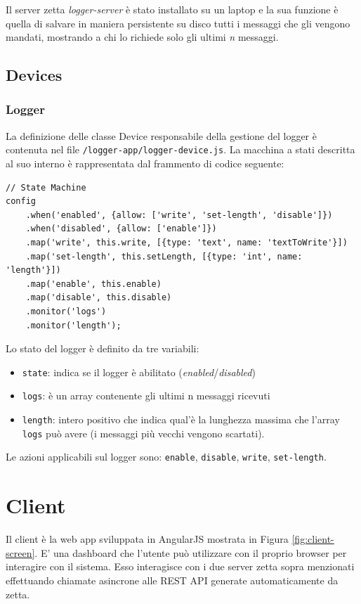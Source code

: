 \documentclass[]{scrartcl}
\begin{document}
Il server zetta \textit{logger-server} è stato installato su un laptop e la sua funzione è quella di salvare in maniera persistente su disco tutti i messaggi che gli vengono mandati, mostrando a chi lo richiede solo gli ultimi \textit{n} messaggi.

\subsection{Devices}

\subsubsection{Logger}

La definizione delle classe Device responsabile della gestione del logger è contenuta nel file \texttt{/logger-app/logger-device.js}. La macchina a stati descritta al suo interno è rappresentata dal frammento di codice seguente:

\begin{lstlisting}[caption=Definizione della macchina a stati del logger]
// State Machine
config
	.when('enabled', {allow: ['write', 'set-length', 'disable']})
	.when('disabled', {allow: ['enable']})
	.map('write', this.write, [{type: 'text', name: 'textToWrite'}])
	.map('set-length', this.setLength, [{type: 'int', name: 'length'}])
	.map('enable', this.enable)
	.map('disable', this.disable)
	.monitor('logs')
	.monitor('length');
\end{lstlisting}

Lo stato del logger è definito da tre variabili:
\begin{itemize}
\item \texttt{state}: indica se il logger è abilitato (\textit{enabled}/\textit{disabled})
\item \texttt{logs}: è un array contenente gli ultimi n messaggi ricevuti
\item \texttt{length}: intero positivo che indica qual'è la lunghezza massima che l'array \texttt{logs} può avere (i messaggi più vecchi vengono scartati).
\end{itemize}

Le azioni applicabili sul logger sono: \texttt{enable}, \texttt{disable}, \texttt{write}, \texttt{set-length}.


\section{Client}

Il client è la web app sviluppata in AngularJS mostrata in Figura \ref{fig:client-screen}. E' una dashboard che l'utente può utilizzare con il proprio browser per interagire con il sistema. Esso interagisce con i due server zetta sopra menzionati effettuando chiamate asincrone alle REST API generate automaticamente da zetta.
\end{document}
